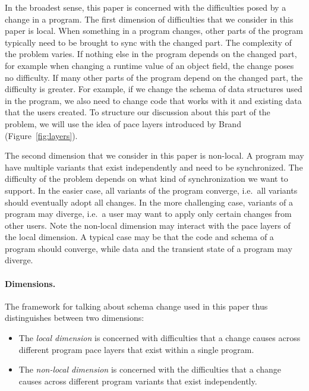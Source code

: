 \documentclass[english,submission]{programming}
\begin{document}
In the broadest sense, this paper is concerned with the difficulties posed by a change
in a program. The first dimension of difficulties that we consider in this paper is
local. When something in a program changes, other parts of the program typically
need to be brought to sync with the changed part. The complexity of the problem varies.
If nothing else in the program depends on the changed part, for example when changing
a runtime value of an object field, the change poses no difficulty.
If many other parts of the program depend on the changed part, the difficulty is greater.
For example, if we change the schema of data structures used in the program, we also need to
change code that works with it and existing data that the users created. To structure our
discussion about this part of the problem, we will use the idea of pace layers introduced by
Brand \cite{Brand95,Brand18} (Figure~\ref{fig:layers}).

The second dimension that we consider in this paper is non-local. A program may have multiple
variants that exist independently and need to be synchronized. The difficulty of the problem
depends on what kind of synchronization we want to support. In the easier case, all variants
of the program converge, i.e.~all variants should eventually adopt all changes. In the more
challenging case, variants of a program may diverge, i.e.~a user may want to apply only certain
changes from other users. Note the non-local dimension may interact with the pace layers of the
local dimension. A typical case may be that the code and schema of a program should converge,
while data and the transient state of a program may diverge.

\paragraph{Dimensions.}
The framework for talking about schema change used in this paper thus distinguishes between
two dimensions:

\begin{itemize}
  \item The \emph{local dimension} is concerned with difficulties that a change causes
    across different program pace layers that exist within a single program.
  \item The \emph{non-local dimension} is concerned with the difficulties that a change causes
    across different program variants that exist independently.
\end{itemize}
\end{document}
